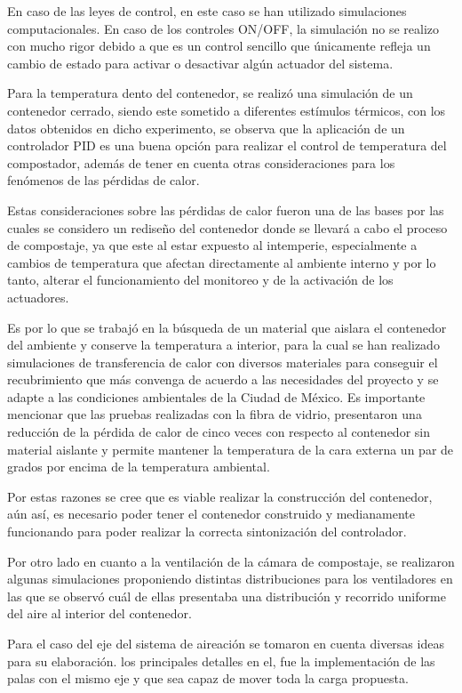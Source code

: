 En caso de las leyes de control, en este caso se han utilizado simulaciones computacionales. En caso de los controles ON/OFF, la simulación no se realizo con mucho rigor debido a que es un control  sencillo que únicamente refleja un cambio de estado para activar o desactivar algún actuador del sistema.

Para la temperatura dento del contenedor, se realizó una simulación de un contenedor cerrado, siendo este sometido a diferentes estímulos térmicos, con los datos obtenidos en dicho experimento, se observa que la aplicación de un controlador PID es una buena opción para realizar el control de temperatura del compostador, además de tener en cuenta otras consideraciones para los fenómenos de las pérdidas de calor.

Estas consideraciones sobre las pérdidas de calor fueron una de las bases por las cuales se considero un rediseño del contenedor donde se llevará a cabo el proceso de compostaje, ya que este al estar expuesto al intemperie, especialmente a cambios de temperatura que afectan directamente al ambiente interno y por lo tanto, alterar el funcionamiento del monitoreo y de la activación de los actuadores.

Es por lo que se trabajó en la búsqueda de un material que aislara el contenedor del ambiente y conserve la temperatura a interior, para la cual se han realizado simulaciones de transferencia de calor con diversos materiales para conseguir el recubrimiento que más convenga de acuerdo a las necesidades del proyecto y se adapte a las condiciones ambientales de la Ciudad de México. Es importante mencionar que las pruebas realizadas con la fibra de vidrio, presentaron una reducción de la pérdida de calor de cinco veces con respecto al contenedor sin material aislante y permite mantener la temperatura de la cara externa un par de grados por encima de la temperatura ambiental. 

Por estas razones se cree que es viable realizar la construcción del contenedor, aún así, es necesario poder tener el contenedor construido y medianamente funcionando para poder realizar la correcta sintonización del controlador.

Por otro lado en cuanto a la ventilación de la cámara de compostaje, se realizaron algunas simulaciones proponiendo distintas distribuciones para los ventiladores en las que se observó cuál de ellas presentaba una distribución y recorrido uniforme del aire al interior del contenedor. 

Para el caso del eje del sistema de aireación se tomaron en cuenta diversas ideas para su elaboración. los principales detalles en el, fue la implementación de las palas con el mismo eje y que sea capaz de mover toda la carga propuesta. 

